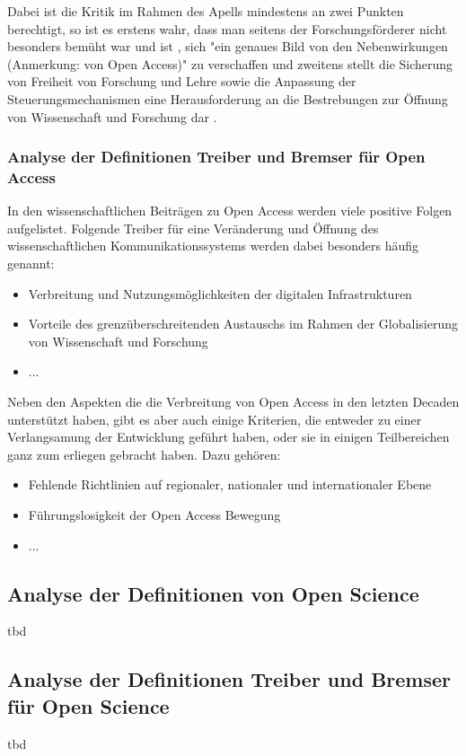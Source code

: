 Dabei ist die Kritik im Rahmen des Apells mindestens an zwei Punkten berechtigt, so ist es erstens wahr, dass man seitens der Forschungsförderer nicht besonders bemüht war und ist \cite{suchen}, sich "ein genaues Bild von den Nebenwirkungen (Anmerkung: von Open Access)" \cite{Reuss_2009} zu verschaffen und zweitens stellt die Sicherung von Freiheit von Forschung und Lehre sowie die Anpassung der Steuerungsmechanismen eine Herausforderung an die Bestrebungen zur Öffnung von Wissenschaft und Forschung dar \cite{suchen}.

\subsubsection{Analyse der Definitionen Treiber und Bremser für Open Access} 

In den wissenschaftlichen Beiträgen zu Open Access werden viele positive Folgen aufgelistet. Folgende Treiber für eine Veränderung und Öffnung des wissenschaftlichen Kommunikationssystems werden dabei besonders häufig genannt:

\begin{itemize}
\item Verbreitung und Nutzungsmöglichkeiten der digitalen Infrastrukturen
\item Vorteile des grenzüberschreitenden Austauschs im Rahmen der Globalisierung von Wissenschaft und Forschung
\item ...
\end{itemize}

Neben den Aspekten die die Verbreitung von Open Access in den letzten Decaden unterstützt haben, gibt es aber auch einige Kriterien, die entweder zu einer Verlangsamung der Entwicklung geführt haben, oder sie in einigen Teilbereichen ganz zum erliegen gebracht haben. Dazu gehören:

\begin{itemize}
\item Fehlende Richtlinien auf regionaler, nationaler und internationaler Ebene
\item Führungslosigkeit der Open Access Bewegung
\item ...
\end{itemize}

\subsection{Analyse der Definitionen von Open Science} 
tbd

\subsection{Analyse der Definitionen Treiber und Bremser für Open Science} 
tbd

